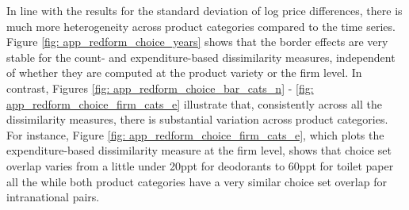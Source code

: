In line with the results for the standard deviation of log price differences, there is much more heterogeneity across product categories compared to the time series. Figure \ref{fig: app_redform_choice_years} shows that the border effects are very stable for the count- and expenditure-based dissimilarity measures, independent of whether they are computed at the product variety or the firm level. In contrast, Figures \ref{fig: app_redform_choice_bar_cats_n} - \ref{fig: app_redform_choice_firm_cats_e} illustrate that, consistently across all the dissimilarity measures, there is substantial variation across product categories. For instance, Figure \ref{fig: app_redform_choice_firm_cats_e}, which plots the expenditure-based dissimilarity measure at the firm level, shows that choice set overlap varies from a little under 20ppt for deodorants to 60ppt for toilet paper all the while both product categories have a very similar choice set overlap for intranational pairs.